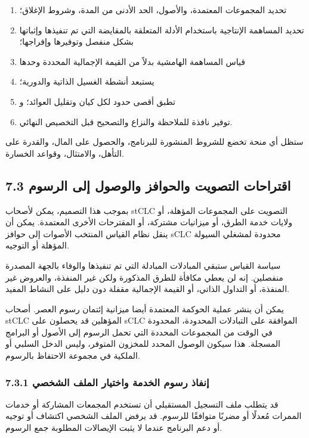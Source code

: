 \documentclass[11pt]{article}
\begin{document}
\begin{enumerate}[leftmargin=*]
\item تحديد المجموعات المعتمدة، والأصول، الحد الأدنى من المدة، وشروط الإغلاق؛
\item تحديد المساهمة الإنتاجية باستخدام الأدلة المتعلقة بالمقايضة التي تم تنفيذها وإثباتها بشكل منفصل وتوفيرها وإفراجها؛
\item قياس المساهمة الهامشية بدلاً من القيمة الإجمالية المحددة وحدها
\item يستبعد أنشطة الغسيل الذاتية والدورية؛
\item تطبق أقصى حدود لكل كيان وتقليل العوائد؛ و
\item توفير نافذة للملاحظة والنزاع والتصحيح قبل التخصيص النهائي.
\end{enumerate}
ستظل أي منحة تخضع للشروط المنشورة للبرنامج، والحصول على المال، والقدرة على التأهل، والامتثال، وقواعد الخسارة.

\subsection*{7.3 اقتراحات التصويت والحوافز والوصول إلى الرسوم}

بموجب هذا التصميم، يمكن لأصحاب stCLC التصويت على المجموعات المؤهلة، أو ولايات خدمة الطرق، أو ميزانيات مشتركة، أو المقترحات الأخرى المعتمدة. يمكن أن ينقل نظام القياس المنتخب الأصوات إلى حوافز sCLC محدودة لمشغلي السيولة المؤهلة أو التوجيه.

سياسة القياس ستبقي المبادلات المبادلة التي تم تنفيذها والوفاء بالجهة المصدرة منفصلين. إنه لن يعطي مكافأة للطرق المذكورة ولكن غير المنفذة، والعروض غير المنفذة، أو التداول الذاتي، أو القيمة الإجمالية مقفلة دون دليل على النشاط المفيد.

يمكن أن ينشر عملية الحوكمة المعتمدة أيضا ميزانية إئتمان رسوم العصر. أصحاب stCLC المؤهلين قد يحصلون على sCLC الموافقة على التبادلات المحدودة، المحدودة في الوقت من المجموعات المحددة التي تحمل الرسوم إلى الأصول أو البرامج المسجلة. هذا سيكون الوصول المحدد للمخزون المتوفر، وليس الدخل السلبي أو الملكية في مجموعة الاحتفاظ بالرسوم.

\subsubsection*{7.3.1 إنفاذ رسوم الخدمة واختيار الملف الشخصي}

قد يتطلب ملف التسجيل المستقبلي أن تستخدم المجمعات المشاركة أو خدمات الممرات مُعدلًا أو مضربًا متوافقًا للرسوم. قد يرفض الملف الشخصي اكتشاف أو توجيه أو دعم البرنامج عندما لا يثبت الإيصالات المطلوبة جمع الرسوم.
\end{document}
